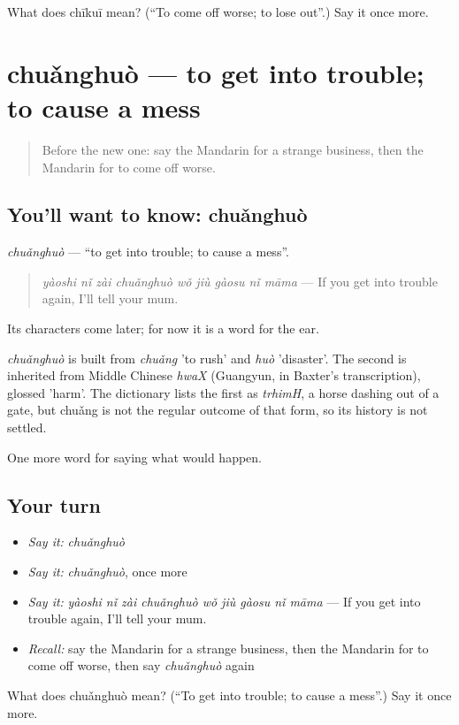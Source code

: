 \begin{tcolorbox}[breakable,colback=teal!4,colframe=teal!35!black,title={Before you move on}]
What does chīkuī mean? (\textquotedblleft{}To come off worse; to lose out\textquotedblright{}.) Say it once more.
\end{tcolorbox}
\section[chuǎnghuò]{chuǎnghuò — to get into trouble; to cause a mess}

\label{lesson:ZH-C539-chuanghuo}



\begin{quote}
Before the new one: say the Mandarin for a strange business, then the Mandarin for to come off worse.
\end{quote}

\subsection*{You'll want to know: chuǎnghuò}
\emph{chuǎnghuò} — \textquotedblleft{}to get into trouble; to cause a mess\textquotedblright{}.

\begin{quote}
\emph{yàoshi nǐ zài chuǎnghuò wǒ jiù gàosu nǐ māma} — If you get into trouble again, I'll tell your mum.
\end{quote}

Its characters come later; for now it is a word for the ear.

\begin{cousinweb}
\emph{chuǎnghuò} is built from \emph{chuǎng} 'to rush' and \emph{huò} 'disaster'. The second is inherited from Middle Chinese \emph{hwaX} (Guangyun, in Baxter's transcription), glossed 'harm'. The dictionary lists the first as \emph{trhimH}, a horse dashing out of a gate, but chuǎng is not the regular outcome of that form, so its history is not settled.
\end{cousinweb}

\begin{grammarlens}[title={What you've built}]
One more word for saying what would happen.
\end{grammarlens}

\subsection*{Your turn}
\begin{itemize}
\raggedright
  \item \emph{Say it:} \emph{chuǎnghuò}
  \item \emph{Say it:} \emph{chuǎnghuò}, once more
  \item \emph{Say it:} \emph{yàoshi nǐ zài chuǎnghuò wǒ jiù gàosu nǐ māma} — If you get into trouble again, I'll tell your mum.
  \item \emph{Recall:} say the Mandarin for a strange business, then the Mandarin for to come off worse, then say \emph{chuǎnghuò} again
\end{itemize}

\begin{tcolorbox}[breakable,colback=teal!4,colframe=teal!35!black,title={Before you move on}]
What does chuǎnghuò mean? (\textquotedblleft{}To get into trouble; to cause a mess\textquotedblright{}.) Say it once more.
\end{tcolorbox}
